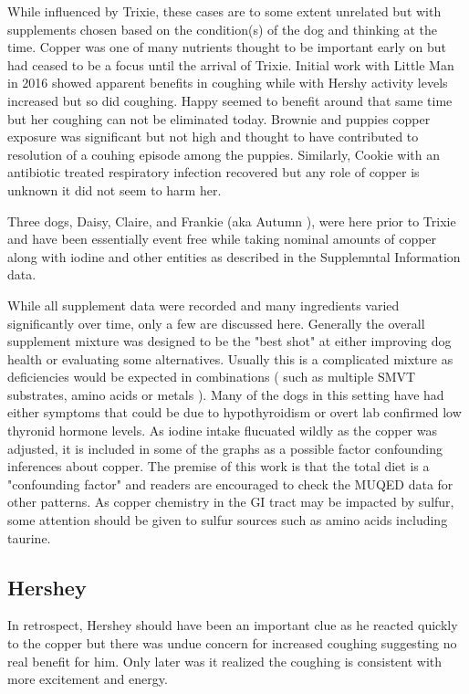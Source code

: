 While influenced by Trixie, these cases are to some extent 
unrelated but with supplements
chosen based on the condition(s) of the dog and thinking at the time.
Copper was one of many nutrients thought to be important early on
but had ceased to be a  focus until the arrival of Trixie. 
Initial work with Little Man in 2016 showed apparent benefits in coughing
while with Hershy activity levels increased but so did coughing.
Happy seemed to benefit around that same time but her coughing
can not be eliminated today. Brownie and puppies copper exposure was
significant but not high and thought to have contributed to resolution
of a couhing episode among the puppies. Similarly,  Cookie with
an antibiotic treated respiratory infection recovered
but any role of copper is unknown it did not seem to harm her.

 Three dogs, Daisy, Claire, and Frankie (aka Autumn ), were
here prior to Trixie and have been essentially event free while
taking nominal amounts of copper along with iodine and other
entities as described in the Supplemntal Information data. 

While all supplement data were recorded and many
ingredients  varied significantly over time, only a few are discussed here. 
Generally the overall supplement mixture was designed to be the "best shot"
at either improving dog health or evaluating some alternatives.
Usually this is a complicated mixture as deficiencies would be expected
in combinations ( such as multiple SMVT substrates, amino acids or metals ). 
Many of the dogs in this setting have had either symptoms
that could be due to hypothyroidism or overt lab confirmed
low thyronid hormone levels. As iodine intake flucuated 
wildly as the copper was adjusted, it is included in some of the graphs as 
a possible factor confounding inferences about copper. 
The premise of this work is that the total diet is
a "confounding factor" and readers are encouraged to check
the MUQED data for other patterns. As copper chemistry in the
GI tract may be impacted by sulfur, some attention should
be given to sulfur sources such as amino acids including taurine.  


\mjmcasetab


\subsection{Hershey}

In retrospect, Hershey should have been an important clue
as he reacted quickly to the copper but there was undue concern
for increased coughing suggesting no real benefit for him. Only
later was it realized the coughing is consistent with
more excitement and energy. 

